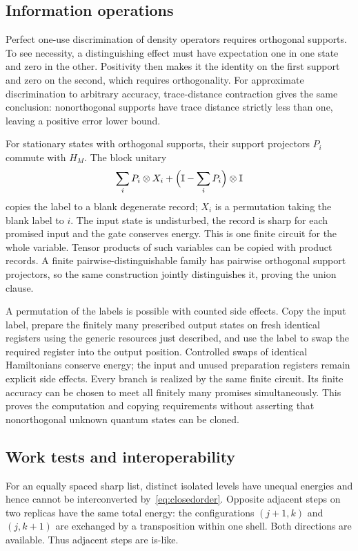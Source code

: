 \subsection{Information operations}
Perfect one-use discrimination of density operators requires orthogonal supports. To see necessity, a distinguishing effect must have expectation one in one state and zero in the other. Positivity then makes it the identity on the first support and zero on the second, which requires orthogonality. For approximate discrimination to arbitrary accuracy, trace-distance contraction gives the same conclusion: nonorthogonal supports have trace distance strictly less than one, leaving a positive error lower bound.

For stationary states with orthogonal supports, their support projectors $P_i$ commute with $H_M$. The block unitary
\[
 \sum_iP_i\otimes X_i+\Bigl(\mathbb{I}-\sum_iP_i\Bigr)\otimes\mathbb{I}
\]
copies the label to a blank degenerate record; $X_i$ is a permutation taking the blank label to $i$. The input state is undisturbed, the record is sharp for each promised input and the gate conserves energy. This is one finite circuit for the whole variable. Tensor products of such variables can be copied with product records. A finite pairwise-distinguishable family has pairwise orthogonal support projectors, so the same construction jointly distinguishes it, proving the union clause.

A permutation of the labels is possible with counted side effects. Copy the input label, prepare the finitely many prescribed output states on fresh identical registers using the generic resources just described, and use the label to swap the required register into the output position. Controlled swaps of identical Hamiltonians conserve energy; the input and unused preparation registers remain explicit side effects. Every branch is realized by the same finite circuit. Its finite accuracy can be chosen to meet all finitely many promises simultaneously. This proves the computation and copying requirements without asserting that nonorthogonal unknown quantum states can be cloned.

\subsection{Work tests and interoperability}\label{sec:worktests}
For an equally spaced sharp list, distinct isolated levels have unequal energies and hence cannot be interconverted by~\eqref{eq:closedorder}. Opposite adjacent steps on two replicas have the same total energy: the configurations $(j+1,k)$ and $(j,k+1)$ are exchanged by a transposition within one shell. Both directions are available. Thus adjacent steps are is-like.


